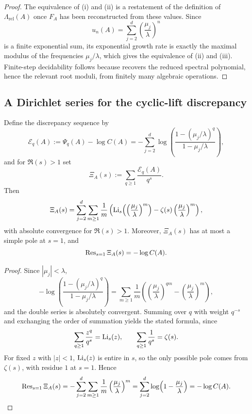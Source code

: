 \begin{proof}
  The equivalence of (i) and (ii) is a restatement of the definition of
  \(\Lambda_{\mathrm{rel}}(A)\) once \(F_A\) has been reconstructed from
  these values. Since
  \[
    u_n(A)=\sum_{j=2}^d\left(\frac{\mu_j}{\lambda}\right)^n
  \]
  is a finite exponential sum, its exponential growth rate is exactly
  the maximal modulus of the frequencies \(\mu_j/\lambda\), which gives the
  equivalence of (ii) and (iii). Finite-step decidability follows
  because 
  recovers the reduced spectral polynomial, hence the relevant root
  moduli, from finitely many algebraic operations.
\end{proof}

\subsection{A Dirichlet series for the cyclic-lift discrepancy}

\begin{theorem}
  \label{thm:finite-part-cyclic-lift-polylog-dirichlet-xi}
  Define the discrepancy sequence by
  \[
    \mathcal E_q(A):=\Psi_q(A)-\log C(A)
    =-\sum_{j=2}^d
      \log\!\left(
        \frac{1-(\mu_j/\lambda)^q}{1-\mu_j/\lambda}
      \right),
  \]
  and for \(\Re(s)>1\) set
  \[
    \Xi_A(s):=\sum_{q\ge 1}\frac{\mathcal E_q(A)}{q^s}.
  \]
  Then
  \[
    \Xi_A(s)
    =\sum_{j=2}^d\sum_{m\ge 1}\frac{1}{m}
      \left(
        \operatorname{Li}_s\!\left(\left(\frac{\mu_j}{\lambda}\right)^m\right)
        -\zeta(s)\left(\frac{\mu_j}{\lambda}\right)^m
      \right),
  \]
  with absolute convergence for \(\Re(s)>1\). Moreover,
  \(\Xi_A(s)\) has at most a simple pole at \(s=1\), and
  \[
    \operatorname{Res}_{s=1}\Xi_A(s)=-\log C(A).
  \]
\end{theorem}

\begin{proof}
  Since \(|\mu_j|<\lambda\),
  \[
    -\log\!\left(
      \frac{1-(\mu_j/\lambda)^q}{1-\mu_j/\lambda}
    \right)
    =\sum_{m\ge 1}\frac{1}{m}
      \left(
        \left(\frac{\mu_j}{\lambda}\right)^{qm}
        -\left(\frac{\mu_j}{\lambda}\right)^m
      \right),
  \]
  and the double series is absolutely convergent. Summing over \(q\)
  with weight \(q^{-s}\) and exchanging the order of summation yields
  the stated formula, since
  \[
    \sum_{q\ge 1}\frac{z^q}{q^s}=\operatorname{Li}_s(z),
    \qquad
    \sum_{q\ge 1}\frac{1}{q^s}=\zeta(s).
  \]
  For fixed \(z\) with \(|z|<1\), \(\operatorname{Li}_s(z)\) is entire in \(s\), so
  the only possible pole comes from \(\zeta(s)\), with residue \(1\) at
  \(s=1\). Hence
  \[
    \operatorname{Res}_{s=1}\Xi_A(s)
    =-\sum_{j=2}^d\sum_{m\ge 1}
      \frac{1}{m}\left(\frac{\mu_j}{\lambda}\right)^m
    =\sum_{j=2}^d\log\!\left(1-\frac{\mu_j}{\lambda}\right)
    =-\log C(A).
  \]
\end{proof}

